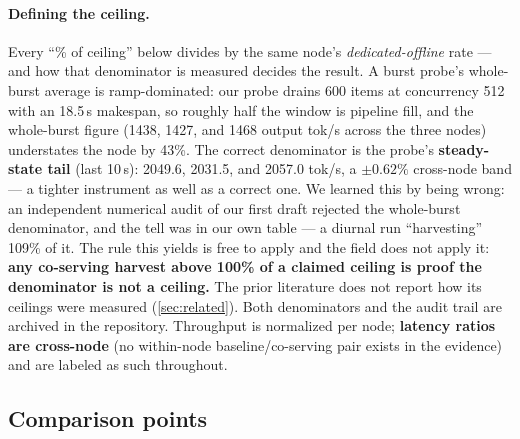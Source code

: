 \documentclass[conference]{IEEEtran}
\begin{document}
\paragraph{Defining the ceiling.} Every ``\% of ceiling'' below divides by the same
node's \emph{dedicated-offline} rate --- and how that denominator is measured decides the
result. A burst probe's whole-burst average is ramp-dominated: our probe drains 600 items
at concurrency 512 with an 18.5\,s makespan, so roughly half the window is pipeline fill,
and the whole-burst figure (1438, 1427, and 1468 output tok/s across the three nodes)
understates the node by 43\%. The correct denominator is the probe's
\textbf{steady-state tail} (last 10\,s): 2049.6, 2031.5, and 2057.0 tok/s, a
$\pm 0.62\%$ cross-node band --- a tighter
instrument as well as a correct one. We learned this by being wrong: an independent
numerical audit of our first draft rejected the whole-burst denominator, and the tell was
in our own table --- a diurnal run ``harvesting'' 109\% of it. The rule this yields is
free to apply and the field does not apply it: \textbf{any co-serving harvest above
100\% of a claimed ceiling is proof the denominator is not a ceiling.} The prior
literature does not report how its ceilings were measured (\cref{sec:related}). Both
denominators and the audit trail are archived in the repository. Throughput is
normalized per node; \textbf{latency ratios are cross-node} (no within-node
baseline/co-serving pair exists in the evidence) and are labeled as such throughout.

\subsection{Comparison points}
\label{sec:baselines}
\end{document}

